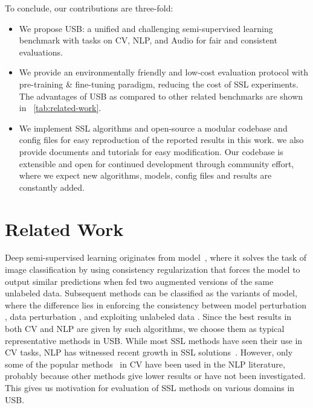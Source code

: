 \documentclass{article}
\newcommand{\datasetnum}{\xspace}
\newcommand{\revision}[1]{{\color{black}{#1}}}
\begin{document}
To conclude, our contributions are three-fold:
\begin{itemize}
\itemsep=0em
    \item We propose USB: a unified and challenging semi-supervised learning benchmark \revision{for classification} with \datasetnum tasks on CV, NLP, and Audio for fair and consistent evaluations. \revision{To our humble knowledge, we are the first to discuss whether current SSL methods that work well on CV tasks generalize to NLP and Audio tasks.}
    \item We provide an environmentally friendly and low-cost evaluation protocol with pre-training \& fine-tuning paradigm, reducing the cost of SSL experiments. The advantages of USB as compared to other related benchmarks are shown in \tablename~\ref{tab:related-work}.
    \item We implement  SSL algorithms and open-source a modular codebase and config files for easy reproduction of the reported results in this work. we also provide documents and tutorials for easy modification. Our codebase is extensible and open for continued development through community effort, where we expect new algorithms, models, config files and results are constantly added.
\end{itemize}



\section{Related Work}

Deep semi-supervised learning originates from  model~\cite{rasmus2015semi}, where it solves the task of image classification by using consistency regularization that forces the model to output similar predictions when fed two augmented versions of the same unlabeled data. Subsequent methods can be classified as the variants of  model, where the difference lies in enforcing the consistency between model perturbation \cite{tarvainen2017mean}, data perturbation \cite{miyato2018virtual,xie2020unsupervised}, and exploiting unlabeled data \cite{sohn2020fixmatch,zhang2021flexmatch}. Since the best results in both CV and NLP are given by such algorithms, we choose them as typical representative methods in USB. While most SSL methods have seen their use in CV tasks, NLP has witnessed recent growth in SSL solutions~\cite{xie2020unsupervised,chen2020mixtext}. However, only some of the popular methods~\cite{xie2020unsupervised} in CV have been used in the NLP literature, probably because other methods give lower results or have not been investigated. This gives us motivation for evaluation of SSL methods on various domains in USB. 
\end{document}
